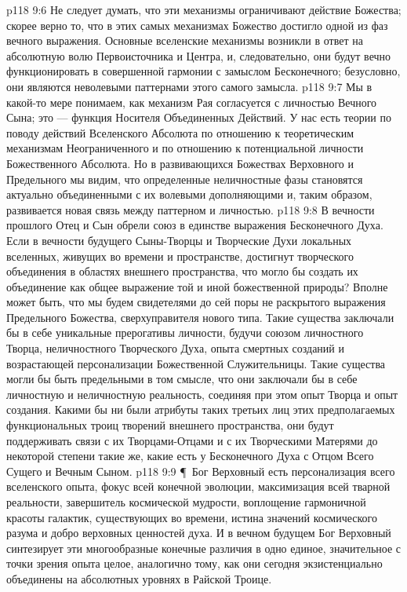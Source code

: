 \vs p118 9:6 Не следует думать, что эти механизмы ограничивают действие Божества; скорее верно то, что в этих самых механизмах Божество достигло одной из фаз вечного выражения. Основные вселенские механизмы возникли в ответ на абсолютную волю Первоисточника и Центра, и, следовательно, они будут вечно функционировать в совершенной гармонии с замыслом Бесконечного; безусловно, они являются неволевыми паттернами этого самого замысла.
\vs p118 9:7 Мы в какой\hyp{}то мере понимаем, как механизм Рая согласуется с личностью Вечного Сына; это --- функция Носителя Объединенных Действий. У нас есть теории по поводу действий Вселенского Абсолюта по отношению к теоретическим механизмам Неограниченного и по отношению к потенциальной личности Божественного Абсолюта. Но в развивающихся Божествах Верховного и Предельного мы видим, что определенные неличностные фазы становятся актуально объединенными с их волевыми дополняющими и, таким образом, развивается новая связь между паттерном и личностью.
\vs p118 9:8 В вечности прошлого Отец и Сын обрели союз в единстве выражения Бесконечного Духа. Если в вечности будущего Сыны\hyp{}Творцы и Творческие Духи локальных вселенных, живущих во времени и пространстве, достигнут творческого объединения в областях внешнего пространства, что могло бы создать их объединение как общее выражение той и иной божественной природы? Вполне может быть, что мы будем свидетелями до сей поры не раскрытого выражения Предельного Божества, сверхуправителя нового типа. Такие существа заключали бы в себе уникальные прерогативы личности, будучи союзом личностного Творца, неличностного Творческого Духа, опыта смертных созданий и возрастающей персонализации Божественной Служительницы. Такие существа могли бы быть предельными в том смысле, что они заключали бы в себе личностную и неличностную реальность, соединяя при этом опыт Творца и опыт создания. Какими бы ни были атрибуты таких третьих лиц этих предполагаемых функциональных троиц творений внешнего пространства, они будут поддерживать связи с их Творцами\hyp{}Отцами и с их Творческими Матерями до некоторой степени такие же, какие есть у Бесконечного Духа с Отцом Всего Сущего и Вечным Сыном.
\vs p118 9:9 \P\ Бог Верховный есть персонализация всего вселенского опыта, фокус всей конечной эволюции, максимизация всей тварной реальности, завершитель космической мудрости, воплощение гармоничной красоты галактик, существующих во времени, истина значений космического разума и добро верховных ценностей духа. И в вечном будущем Бог Верховный синтезирует эти многообразные конечные различия в одно единое, значительное с точки зрения опыта целое, аналогично тому, как они сегодня экзистенциально объединены на абсолютных уровнях в Райской Троице.
